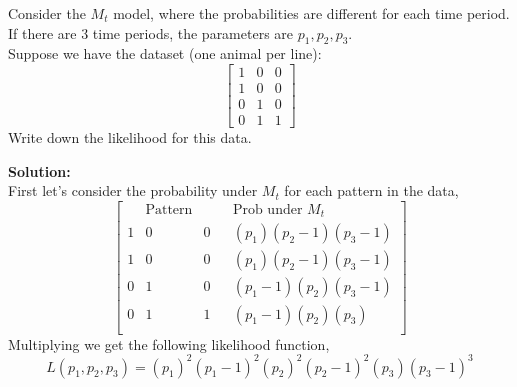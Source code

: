 \documentclass[12pt]{article}
\makeatletter
\theoremstyle{homework}
\newenvironment{exercise}[1]
{\def\@currentlabel{#1}\exercisecore}
{\endexercisecore}
\newcommand{\localhead}[1]{\par\smallskip\noindent\textbf{#1}\nobreak\\}%
\newcommand\solution{\localhead{Solution:}}
\makeatother
\begin{document}
\begin{exercise}{5}Consider the $M_t$ model, where the probabilities are different for each time period.  If there are 3 time periods, the parameters are $p_1, p_2, p_3$.\\
  Suppose we have the dataset (one animal per line):
  \begin{equation*}
    \begin{bmatrix}
      1&0&0\\
      1&0&0\\
      0&1&0\\
      0&1&1
    \end{bmatrix}
  \end{equation*}
  Write down the likelihood for this data. \\
  \solution First let's consider the probability under $M_t$ for each pattern in the data, 
  \begin{equation*}
    \begin{bmatrix}
      &\text{Pattern}& && \text{Prob under $M_t$}\\ 
      1&0&0 && (p_1)(p_2 - 1)(p_3 - 1)\\
      1&0&0 && (p_1)(p_2 - 1)(p_3 - 1)\\
      0&1&0 && (p_1 - 1)(p_2)(p_3 - 1)\\
      0&1&1 && (p_1 - 1)(p_2)(p_3)\\
    \end{bmatrix}
  \end{equation*}
  Multiplying we get the following likelihood function, 
  \begin{equation*}
    L(p_1, p_2, p_3) = (p_1)^2(p_1 - 1)^2(p_2)^2(p_2 - 1)^2(p_3)(p_3 - 1)^3
  \end{equation*}
\end{exercise}
\vspace{1in}
\end{document}
